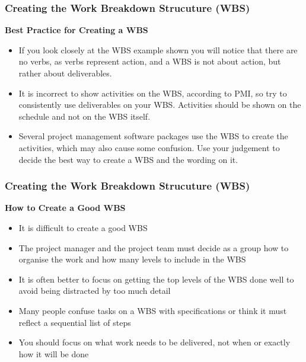\documentclass[aspectratio=169]{beamer}
\begin{document}

\begin{frame}
\frametitle{Creating the Work Breakdown Strucuture (WBS)}
\textbf{Best Practice for Creating a WBS}
\vspace{0.5cm}
\begin{itemize}
\item If you look closely at the WBS example shown you will notice that there are no verbs, as verbs represent action, and a WBS is not about action, but rather about deliverables.
\vspace{0.3cm}
\item It is incorrect to show activities on the WBS, according to PMI, so try to consistently use deliverables on your WBS. Activities should be shown on the schedule and not on the WBS itself.
\vspace{0.3cm}
\item Several project management software packages use the WBS to create the activities, which may also cause some confusion. Use your judgement to decide the best way to create a WBS and the wording on it.
\end{itemize}
\end{frame}

\begin{frame}
\frametitle{Creating the Work Breakdown Strucuture (WBS)}
\textbf{How to Create a Good WBS}
\vspace{0.5cm}
\begin{itemize}
\item It is difficult to create a good WBS
\vspace{0.2cm}
\item The project manager and the project team must decide as a group how to organise the work and how many levels to include in the WBS
\vspace{0.2cm}
\item It is often better to focus on getting the top levels of the WBS done well to avoid being distracted by too much detail
\vspace{0.2cm}
\item Many people confuse tasks on a WBS with specifications or think it must reflect a sequential list of steps
\vspace{0.2cm}
\item You should focus on what work needs to be delivered, not when or exactly how it will be done
\end{itemize}
\end{frame}
\end{document}
